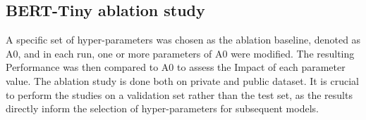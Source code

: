 \begin{table}[H]
    \centering
    \caption{Comparison of BERT-Tiny, BERT-Mini, and BERT-Small on the private test set. Each model was trained on the full training set. Throughput is measured both for the model forward pass and for the full pipeline, including Tokenization.}
    \label{tab:bert_model_selection}
\end{table}

\subsection{BERT-Tiny ablation study}
\label{sec:BERT-Tiny-finetune}
A specific set of hyper-parameters was chosen as the ablation baseline, denoted as A0, and in each run, one or more parameters of A0 were modified. The resulting Performance was then compared to A0 to assess the Impact of each parameter value. The ablation study is done both on private and public dataset. It is crucial to perform the studies on a validation set rather than the test set, as the results directly inform the selection of hyper-parameters for subsequent models.

